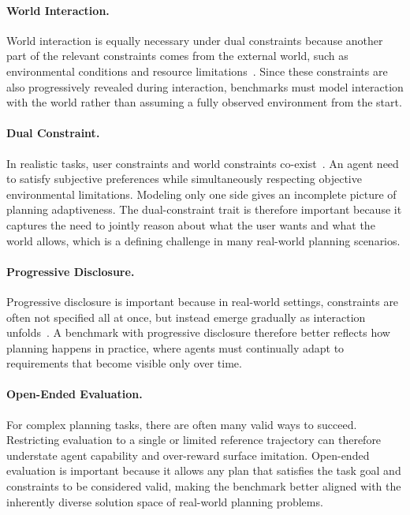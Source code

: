 \paragraph{World Interaction.}
World interaction is equally necessary under dual constraints because another part of the relevant constraints comes from the external world, such as environmental conditions and resource limitations~\citep{PlanBench}. 
Since these constraints are also progressively  revealed during interaction, benchmarks must model interaction with the world rather than assuming a fully observed environment from the start.

\paragraph{Dual Constraint.}
In realistic tasks, user constraints and world constraints co-exist~\citep{wang2024apricotactivepreferencelearning,silver2025coloringlinespersonalizationnull}.
An agent need to satisfy subjective preferences while simultaneously respecting objective environmental limitations. 
Modeling only one side gives an incomplete picture of planning adaptiveness. 
The dual-constraint trait is therefore important because it captures the need to jointly reason about what the user wants and what the world allows, which is a defining challenge in many real-world planning scenarios.

\paragraph{Progressive Disclosure.}
Progressive disclosure is important because in real-world settings, constraints are often not specified all at once, but instead emerge gradually as interaction unfolds~\citep{tau-2-bench,RealPref}. 
A benchmark with progressive disclosure therefore better reflects how planning happens in practice, where agents must continually adapt to requirements that become visible only over time.

\paragraph{Open-Ended Evaluation.}
For complex planning tasks, there are often many valid ways to succeed. 
Restricting evaluation to a single or limited reference trajectory can therefore understate agent capability and over-reward surface imitation. 
Open-ended evaluation is important because it allows any plan that satisfies the task goal and constraints to be considered valid, making the benchmark better aligned with the inherently diverse solution space of real-world planning problems.

